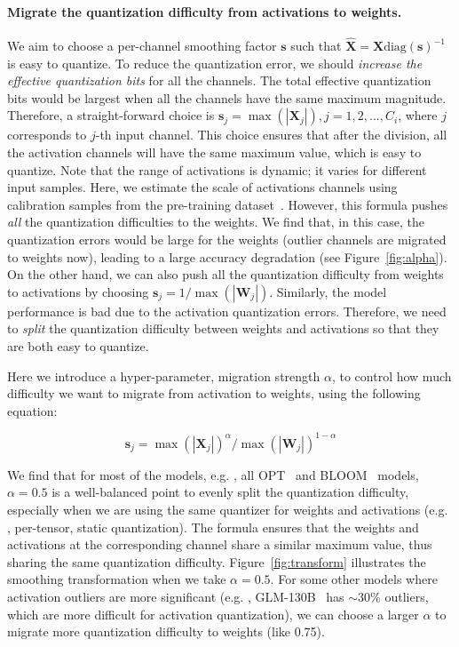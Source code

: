 \paragraph{Migrate the quantization difficulty from activations to weights. } We aim to choose a per-channel smoothing factor $\mathbf{s}$ such that $\hat{\mathbf{X}}=\mathbf{X}\text{diag}(\mathbf{s})^{-1}$ is easy to quantize. To reduce the quantization error, we should \emph{increase the effective quantization bits} for all the channels. The total effective quantization bits would be largest when all the channels have the same maximum magnitude. Therefore, a straight-forward choice is $\mathbf{s}_j = \max(|\mathbf{X}_j|), j=1,2,..., C_i$, where $j$ corresponds to $j$-th input channel. This choice ensures that after the division, all the activation channels will have the same maximum value, which is easy to quantize. Note that the range of activations is dynamic; it varies for different input samples. Here, we estimate the scale of activations channels using calibration samples from the pre-training dataset~\cite{jacob2018quantization}. However, this formula pushes \emph{all} the quantization difficulties to the weights. We find that, in this case, the quantization errors would be large for the weights (outlier channels are migrated to weights now), leading to a large accuracy degradation (see Figure~\ref{fig:alpha}).
On the other hand, we can also push all the quantization difficulty from weights to activations by choosing $\mathbf{s}_j = 1/\max(|\mathbf{W}_j|)$. Similarly, the model performance is bad due to the activation quantization errors. Therefore, we need to \emph{split} the quantization difficulty between weights and activations so that they are both easy to quantize.

Here we introduce a hyper-parameter, migration strength $\alpha$, to control how much difficulty we want to migrate from activation to weights, using the following equation:

\begin{equation} \label{eq:s_sqrt}
    \mathbf{s}_j =  \max(|\mathbf{X}_j|)^{\alpha} / \max(|\mathbf{W}_j|) ^{1-\alpha}
\end{equation}

We find that for most of the models, e.g. , all OPT~\cite{opt} and BLOOM~\cite{scao2022bloom} models, $\alpha=0.5$ is a well-balanced point to evenly split the quantization difficulty, especially when we are using the same quantizer for weights and activations (e.g. , per-tensor, static quantization). The formula ensures that the weights and activations at the corresponding channel share a similar maximum value, thus sharing the same quantization difficulty.
Figure~\ref{fig:transform} illustrates the smoothing transformation when we take $\alpha=0.5$.
For some other models where activation outliers are more significant (e.g. , GLM-130B~\cite{zeng2022glm} has $\sim$30\% outliers, which are more difficult for activation quantization), we can choose a larger $\alpha$ to migrate more quantization difficulty to weights (like 0.75).

